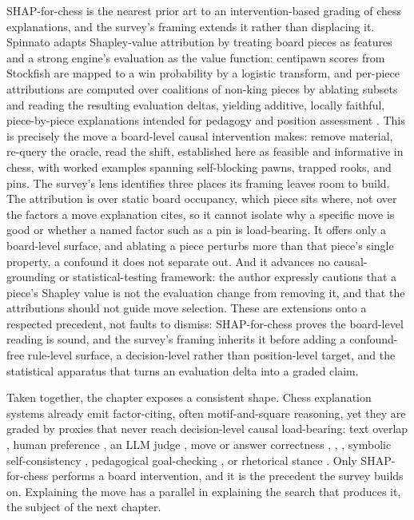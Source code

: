 \documentclass[conference]{IEEEtran}
\begin{document}
SHAP-for-chess is the nearest prior art to an intervention-based grading of chess explanations, and the survey's framing extends it rather than displacing it. Spinnato adapts Shapley-value attribution by treating board pieces as features and a strong engine's evaluation as the value function: centipawn scores from Stockfish are mapped to a win probability by a logistic transform, and per-piece attributions are computed over coalitions of non-king pieces by ablating subsets and reading the resulting evaluation deltas, yielding additive, locally faithful, piece-by-piece explanations intended for pedagogy and position assessment \cite{ref19}. This is precisely the move a board-level causal intervention makes: remove material, re-query the oracle, read the shift, established here as feasible and informative in chess, with worked examples spanning self-blocking pawns, trapped rooks, and pins. The survey's lens identifies three places its framing leaves room to build. The attribution is over static board occupancy, which piece sits where, not over the factors a move explanation cites, so it cannot isolate why a specific move is good or whether a named factor such as a pin is load-bearing. It offers only a board-level surface, and ablating a piece perturbs more than that piece's single property, a confound it does not separate out. And it advances no causal-grounding or statistical-testing framework: the author expressly cautions that a piece's Shapley value is not the evaluation change from removing it, and that the attributions should not guide move selection. These are extensions onto a respected precedent, not faults to dismiss: SHAP-for-chess proves the board-level reading is sound, and the survey's framing inherits it before adding a confound-free rule-level surface, a decision-level rather than position-level target, and the statistical apparatus that turns an evaluation delta into a graded claim.

Taken together, the chapter exposes a consistent shape. Chess explanation systems already emit factor-citing, often motif-and-square reasoning, yet they are graded by proxies that never reach decision-level causal load-bearing: text overlap \cite{ref22}, human preference \cite{ref21}, an LLM judge \cite{ref11}, move or answer correctness \cite{ref12}, \cite{ref13}, \cite{ref47}, symbolic self-consistency \cite{ref54}, pedagogical goal-checking \cite{ref56}, or rhetorical stance \cite{ref61}. Only SHAP-for-chess \cite{ref19} performs a board intervention, and it is the precedent the survey builds on. Explaining the move has a parallel in explaining the search that produces it, the subject of the next chapter.
\end{document}
